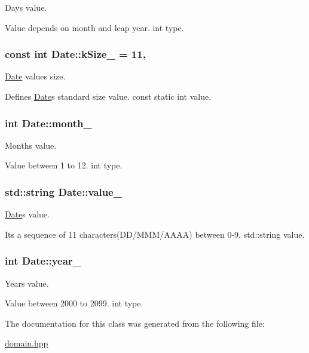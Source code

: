 Day\textquotesingle{}s value. 

Value depends on month and leap year. int type. 
\subsubsection[{\texorpdfstring{k\+Size\+\_\+}{kSize_}}]{\setlength{\rightskip}{0pt plus 5cm}const int Date\+::k\+Size\+\_\+ = 11\hspace{0.3cm}{\ttfamily [static]}, {\ttfamily [private]}}\hypertarget{classDate_a2734054bf4ae859c5a2df8bde04284ee}{}\label{classDate_a2734054bf4ae859c5a2df8bde04284ee}


\hyperlink{classDate}{Date} value\textquotesingle{}s size. 

Defines \hyperlink{classDate}{Date}\textquotesingle{}s standard size value. const static int value. 
\subsubsection[{\texorpdfstring{month\+\_\+}{month_}}]{\setlength{\rightskip}{0pt plus 5cm}int Date\+::month\+\_\+\hspace{0.3cm}{\ttfamily [private]}}\hypertarget{classDate_ae70a5a5a937ab5ce563cac90e3d8fd4d}{}\label{classDate_ae70a5a5a937ab5ce563cac90e3d8fd4d}


Month\textquotesingle{}s value. 

Value between 1 to 12. int type. 
\subsubsection[{\texorpdfstring{value\+\_\+}{value_}}]{\setlength{\rightskip}{0pt plus 5cm}std\+::string Date\+::value\+\_\+\hspace{0.3cm}{\ttfamily [private]}}\hypertarget{classDate_ae79a9217c5779085c923cb82b9a0b339}{}\label{classDate_ae79a9217c5779085c923cb82b9a0b339}


\hyperlink{classDate}{Date}\textquotesingle{}s value. 

It\textquotesingle{}s a sequence of 11 characters(D\+D/\+M\+M\+M/\+A\+A\+AA) between 0-\/9. std\+::string value. 
\subsubsection[{\texorpdfstring{year\+\_\+}{year_}}]{\setlength{\rightskip}{0pt plus 5cm}int Date\+::year\+\_\+\hspace{0.3cm}{\ttfamily [private]}}\hypertarget{classDate_a000b73bb5ec170bcb9c55fe504ee1c3c}{}\label{classDate_a000b73bb5ec170bcb9c55fe504ee1c3c}


Year\textquotesingle{}s value. 

Value between 2000 to 2099. int type. 

The documentation for this class was generated from the following file\+:\begin{DoxyCompactItemize}
\item 
\hyperlink{domain_8hpp}{domain.\+hpp}\end{DoxyCompactItemize}
